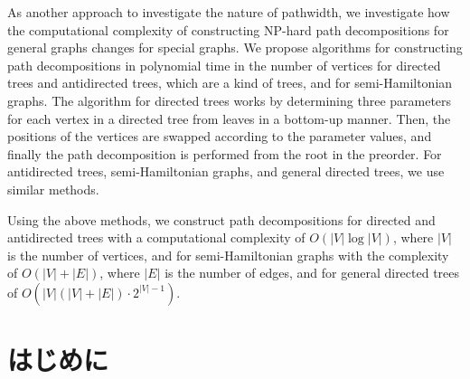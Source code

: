 \documentclass{kuisthesis}           %
\begin{document}
\begin{eabstract}
As another approach to investigate the nature of pathwidth, we investigate how the computational complexity of constructing NP-hard path decompositions for general graphs changes for special graphs. We propose algorithms for constructing path decompositions in polynomial time in the number of vertices for directed trees and antidirected trees, which are a kind of trees, and for semi-Hamiltonian graphs. The algorithm for directed trees works by determining three parameters for each vertex in a directed tree from leaves in a bottom-up manner. Then, the positions of the vertices are swapped according to the parameter values, and finally the path decomposition is performed from the root in the preorder. For antidirected trees, semi-Hamiltonian graphs, and general directed trees, we use similar methods. 


Using the above methods, we construct path decompositions for directed and antidirected trees with a computational complexity of $O(|V|\log|V|)$, where $|V|$ is the number of vertices, and for semi-Hamiltonian graphs with the complexity of $O(|V|+|E|)$, where $|E|$ is the number of edges, and for general directed trees of $O(|V|(|V|+|E|)\cdot2^{|V|-1})$.



\end{eabstract}

\tableofcontents				%

\section{はじめに}\label{sec-intro}		%
\end{document}
